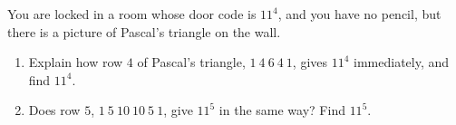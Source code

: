 You are locked in a room whose door code is $11^4$, and you have no pencil, but there is a picture of Pascal's triangle on the wall.
\begin{enumerate}
\item[(a)] Explain how row $4$ of Pascal's triangle, $1\ 4\ 6\ 4\ 1$, gives $11^4$ immediately, and find $11^4$.
\item[(b)] Does row $5$, $1\ 5\ 10\ 10\ 5\ 1$, give $11^5$ in the same way? Find $11^5$.
\end{enumerate}
